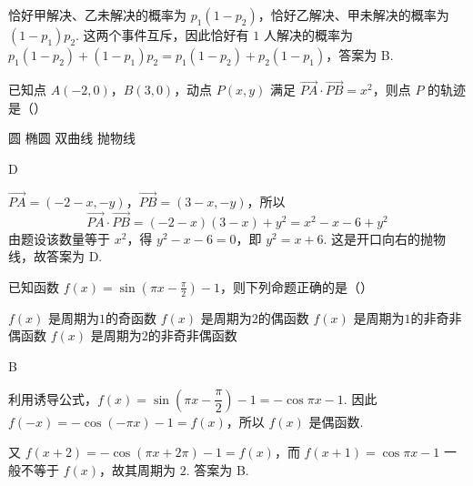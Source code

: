 \begin{solution}
恰好甲解决、乙未解决的概率为 \(p_1(1-p_2)\)，恰好乙解决、甲未解决的概率为 \((1-p_1)p_2\). 这两个事件互斥，因此恰好有 \(1\) 人解决的概率为
\(p_1(1-p_2)+(1-p_1)p_2=p_1(1-p_2)+p_2(1-p_1)\)，答案为 B.
\end{solution}

\begin{problem}
已知点 \(A(-2,0)\)，\(B(3,0)\)，动点 \(P(x, y)\) 满足 \(\overrightarrow{PA} \cdot \overrightarrow{PB} = x^2\)，则点 \(P\) 的轨迹是（\quad）

\choices
    {圆}
    {椭圆}
    {双曲线}
    {抛物线}
\end{problem}

\begin{answer}D\end{answer}

\begin{solution}
\(\overrightarrow{PA}=(-2-x,-y)\)，\(\overrightarrow{PB}=(3-x,-y)\)，所以
\[
\overrightarrow{PA}\cdot\overrightarrow{PB}=(-2-x)(3-x)+y^2=x^2-x-6+y^2
\]
由题设该数量等于 \(x^2\)，得 \(y^2-x-6=0\)，即
\(y^2=x+6\). 这是开口向右的抛物线，故答案为 D.
\end{solution}

\begin{problem}
已知函数 \( f(x) = \sin \left( \pi x - \frac{\pi}{2} \right) - 1 \)，则下列命题正确的是（\quad）

\choices
    {\(f(x)\) 是周期为\(1\)的奇函数}
    {\(f(x)\) 是周期为\(2\)的偶函数}
    {\(f(x)\) 是周期为\(1\)的非奇非偶函数}
    {\(f(x)\) 是周期为\(2\)的非奇非偶函数}
\end{problem}

\begin{answer}B\end{answer}

\begin{solution}
利用诱导公式，\(f(x)=\sin\left(\pi x-\dfrac{\pi}{2}\right)-1=-\cos\pi x-1\). 因此
\(f(-x)=-\cos(-\pi x)-1=f(x)\)，所以 \(f(x)\) 是偶函数.

又 \(f(x+2)=-\cos(\pi x+2\pi)-1=f(x)\)，而
\(f(x+1)=\cos\pi x-1\) 一般不等于 \(f(x)\)，故其周期为 \(2\). 答案为 B.
\end{solution}

